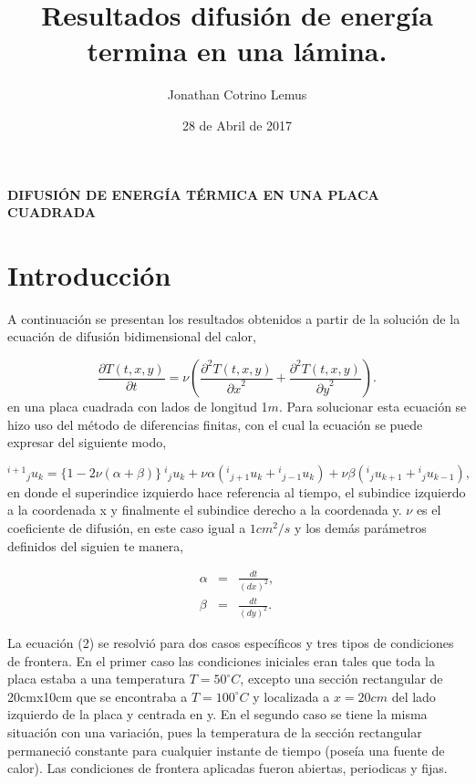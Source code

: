 \documentclass{article}
\title{Resultados difusión de energía termina en una lámina.}
\author{Jonathan Cotrino Lemus}
\date{28 de Abril de 2017}
\begin{document}
\begin{center}
\textbf{\large{DIFUSI\'ON DE ENERG\'IA T\'ERMICA EN UNA PLACA CUADRADA}}
\end{center}

\section{Introducci\'on}

A continuaci\'on se presentan los resultados obtenidos a partir de la soluci\'on de la ecuaci\'on de difusi\'on bidimensional del calor,

\begin{equation}
\frac{\partial{T(t, x, y)}}{\partial{t}} = \nu \left(  \frac{{\partial}^2 T(t, x, y)}{{\partial x}^2} + \frac{{\partial}^2 T(t, x, y)}{{\partial y}^2} \right).
\end{equation}
en una placa cuadrada con lados de longitud 1$m$.
Para solucionar esta ecuaci\'on se hizo uso del m\'etodo de diferencias finitas, con el cual la ecuaci\'on se puede expresar del siguiente modo,

\begin{equation}
{^{i+1}}{_j}u_k = \{ 1 - 2 \nu (\alpha + \beta)\} \ {^i}{_j} u_{k} + \nu \alpha ({^i}{_{j+1}} u_{k} + {^i}{_{j-1}} u_{k}) + \nu \beta ({^i}{_j} u_{k+1} + {^i}{_j} u_{k-1}),
\end{equation}
 en donde el superindice izquierdo hace referencia al tiempo, el subindice izquierdo a la coordenada x y finalmente el subindice derecho a la coordenada y. $\nu$ es el coeficiente de difusi\'on, en este caso igual a $1 cm^2/s$ y los demás par\'ametros definidos del siguien
te manera,

\begin{eqnarray}
\alpha &=& \frac{dt}{ (dx)^2}, \\ 
\beta &=& \frac{dt}{ (dy)^2}.
\end{eqnarray}


La ecuaci\'on (2) se resolvi\'o para dos casos espec\'ificos y tres tipos de condiciones de frontera. En el primer caso las condiciones iniciales eran tales que toda la placa estaba a una temperatura $T = 50^{\circ} C $, excepto una secci\'on rectangular de  20cmx10cm que se encontraba a $T = 100^{\circ} C$ y  localizada a $x = 20 cm$ del lado izquierdo de la placa y centrada en y. En el segundo caso se tiene la misma situaci\'on con una variaci\'on, pues la temperatura de la secci\'on rectangular permaneci\'o constante para cualquier instante de tiempo (pose\'ia una fuente de calor). Las condiciones de frontera aplicadas fueron abiertas, periodicas y fijas.
\end{document}
